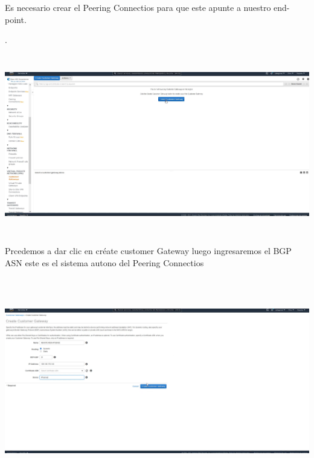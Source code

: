 \documentclass{article} %
\begin{document}
\noindent 

\noindent 

\noindent 

\noindent Es necesario crear el Peering Connectios  para que este apunte a nuestro end-point. 

\noindent . 

\noindent 

\noindent \includegraphics*[width=6.60in, height=3.09in, trim=0.00in 0.48in 1.18in 0.11in]{image2}

\noindent 

\noindent 

\noindent Prcedemos a dar clic en cr\'{e}ate customer Gateway luego ingresaremos el BGP ASN este es el sistema autono del Peering Connectios  

\noindent 

\noindent 

\noindent \includegraphics*[width=6.05in, height=3.57in, trim=0.00in 0.66in 2.72in 0.00in]{image3}
\end{document}
